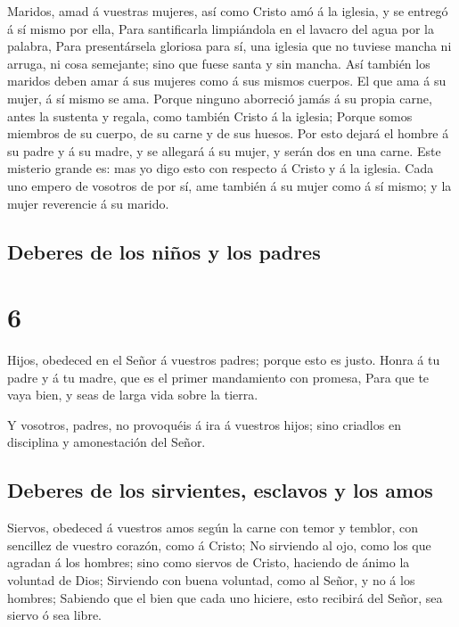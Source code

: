  Maridos, amad á vuestras mujeres, así como Cristo amó á
la iglesia, y se entregó á sí mismo por ella,  Para
santificarla limpiándola en el lavacro del agua por la palabra,
 Para presentársela gloriosa para sí, una iglesia que no
tuviese mancha ni arruga, ni cosa semejante; sino que fuese santa y sin
mancha.  Así también los maridos deben amar á sus mujeres
como á sus mismos cuerpos. El que ama á su mujer, á sí mismo se ama.
 Porque ninguno aborreció jamás á su propia carne, antes
la sustenta y regala, como también Cristo á la iglesia; 
Porque somos miembros de su cuerpo, de su carne y de sus huesos.
 Por esto dejará el hombre á su padre y á su madre, y se
allegará á su mujer, y serán dos en una carne.  Este
misterio grande es: mas yo digo esto con respecto á Cristo y á la
iglesia.  Cada uno empero de vosotros de por sí, ame
también á su mujer como á sí mismo; y la mujer reverencie á su marido.

\hypertarget{deberes-de-los-niuxf1os-y-los-padres}{%
\subsection{Deberes de los niños y los
padres}\label{deberes-de-los-niuxf1os-y-los-padres}}

\hypertarget{section-49-6}{%
\section{6}\label{section-49-6}}

 Hijos, obedeced en el Señor á vuestros padres; porque
esto es justo.  Honra á tu padre y á tu madre, que es el
primer mandamiento con promesa,  Para que te vaya bien, y
seas de larga vida sobre la tierra.

 Y vosotros, padres, no provoquéis á ira á vuestros hijos;
sino criadlos en disciplina y amonestación del Señor.

\hypertarget{deberes-de-los-sirvientes-esclavos-y-los-amos}{%
\subsection{Deberes de los sirvientes, esclavos y los
amos}\label{deberes-de-los-sirvientes-esclavos-y-los-amos}}

 Siervos, obedeced á vuestros amos según la carne con
temor y temblor, con sencillez de vuestro corazón, como á Cristo;
 No sirviendo al ojo, como los que agradan á los hombres;
sino como siervos de Cristo, haciendo de ánimo la voluntad de Dios;
 Sirviendo con buena voluntad, como al Señor, y no á los
hombres;  Sabiendo que el bien que cada uno hiciere, esto
recibirá del Señor, sea siervo ó sea libre.

